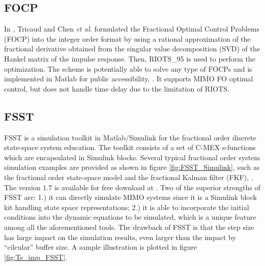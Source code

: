 \documentclass[11pt]{tCON2e}
\theoremstyle{plain}\newtheorem{theorem}{Theorem}
\theoremstyle{definition}
\theoremstyle{remark}
\begin{document}
\subsection{FOCP}
In \cite{ref:FOCP_Tricaud_paper}, Tricaud and Chen \emph{et al.} formulated the Fractional Optimal Control Problems (FOCP) into the integer order format by using a rational
approximation of the fractional derivative obtained from the singular value decomposition (SVD) of the Hankel matrix of the impulse response. Then, RIOTS\_95 \cite{ref:Zhuo_biao, ref:RIOTS_Tricaud_IFAC} is used to perform the optimization. The scheme is potentially able to solve any type of FOCPs and is implemented in Matlab for public accessibility, \cite{ref:FOCP_Tricaud}. It supports MIMO FO optimal control, but does not handle time delay due to the limitation of RIOTS.





\subsection{FSST}
FSST is a simulation toolkit in Matlab/Simulink for the fractional order discrete state-space system education. The toolkit consists of a set of C-MEX s-functions which are encapsulated in Simulink blocks. Several typical fractional order system simulation examples are provided as shown in figure \ref{fig:FSST_Simulink}, such as the fractional order state-space model and the fractional Kalman filter (FKF), \cite{ref:fsst_Dominik_IFAC}. The version $1.7$ is available for free download at \cite{ref:fsst_1_7}.
Two of the superior strengths of FSST are: 1.) it can directly simulate MIMO systems since it is a Simulink block kit handling state space representations; 2.) it is able to incorporate the initial conditions into the dynamic equations to be simulated, which is a unique feature among all the aforementioned tools. The drawback of FSST is that the step size has large impact on the simulation results, even larger than the impact by ``cilcular'' buffer size. A sample illustration is plotted in figure \ref{fig:Ts_imp_FSST}.
\end{document}
